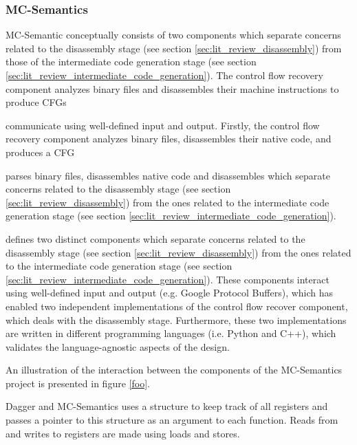 
\subsubsection{MC-Semantics}


MC-Semantic conceptually consists of two components which separate concerns related to the disassembly stage (see section \ref{sec:lit_review_disassembly}) from those of the intermediate code generation stage (see section \ref{sec:lit_review_intermediate_code_generation}). The control flow recovery component analyzes binary files and disassembles their machine instructions to produce CFGs

communicate using well-defined input and output. Firstly, the control flow recovery component analyzes binary files, disassembles their native code, and produces a CFG

parses binary files, disassembles native code  and disassembles   which separate concerns related to the disassembly stage (see section \ref{sec:lit_review_disassembly}) from the ones related to the intermediate code generation stage (see section \ref{sec:lit_review_intermediate_code_generation}).

defines two distinct components which separate concerns related to the disassembly stage (see section \ref{sec:lit_review_disassembly}) from the ones related to the intermediate code generation stage (see section \ref{sec:lit_review_intermediate_code_generation}). These components interact using well-defined input and output (e.g. Google Protocol Buffers), which has enabled two independent implementations of the control flow recover component, which deals with the disassembly stage. Furthermore, these two implementations are written in different programming languages (i.e. Python and C++), which validates the language-agnostic aspects of the design.


An illustration of the interaction between the components of the MC-Semantics project is presented in figure \ref{foo}.

Dagger and MC-Semantics uses a structure to keep track of all registers and passes a pointer to this structure as an argument to each function. Reads from and writes to registers are made using loads and stores.

